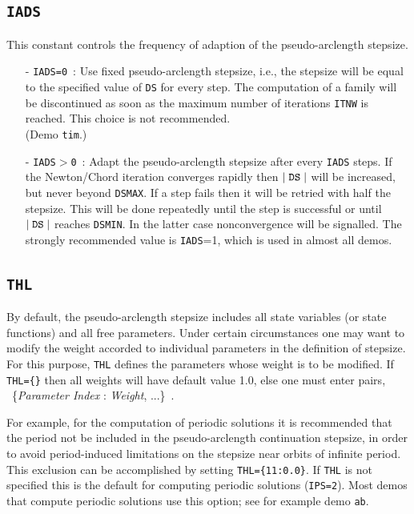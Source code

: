 \documentclass[12pt]{report}
\def\abs#1{\mid#1\mid}
\begin{document}
\subsection{\tt IADS}  \label{sec:IADS}
This constant controls the frequency of adaption of the 
pseudo-arclength stepsize.
\begin{itemize}
\item[-] {\tt IADS=0}~: 
  Use fixed pseudo-arclength stepsize, i.e., the stepsize will
  be equal to the specified value of {\tt DS} for every step.
  The computation of a family will be discontinued as soon as
  the maximum number of iterations {\tt ITNW} is reached.
  This choice is not recommended. \\(Demo {\tt tim}.)
\item[-] {\tt IADS$>$0}~:  
 Adapt the pseudo-arclength stepsize after every {\tt IADS} steps.
  If the Newton/Chord iteration converges rapidly then 
  $\abs{\tt DS}$ will be increased, but never beyond {\tt DSMAX}.
  If a step fails then it will be retried with half
  the stepsize. This will be done repeatedly until the
  step is successful or until $\abs{\tt DS}$ reaches {\tt DSMIN}. 
  In the latter case nonconvergence will be signalled.
  The strongly recommended value is {\tt IADS}=1, which is used in 
  almost all demos.
\end{itemize}
  
\subsection{\tt THL}  \label{sec:THL}
By default, the pseudo-arclength stepsize includes all state variables
(or state functions) and all free parameters.
Under certain circumstances one may want to modify the weight accorded 
to individual parameters in the definition of stepsize.
For this purpose, {\tt THL} defines the parameters whose weight 
is to be modified.
If {\tt THL=\{\}} then all weights will have default value 1.0,
else one must enter pairs,
             ~\{{\it Parameter Index} : {\it Weight}, ...\}~.

For example, for the computation of periodic solutions it is 
recommended that the period not be included in the pseudo-arclength 
continuation stepsize, in order to avoid period-induced limitations 
on the stepsize near orbits of infinite period. 
This exclusion can be accomplished by setting {\tt THL=\{11:0.0\}}.
If {\tt THL} is not specified this is the default for computing
periodic solutions ({\tt IPS=2}).
Most demos that compute periodic solutions use this option;
see for example demo {\tt ab}.
\end{document}
